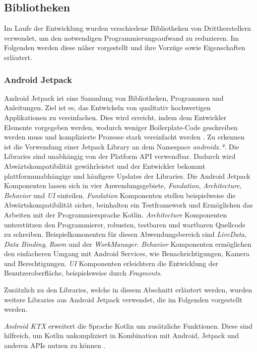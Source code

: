 \documentclass[a4paper]{article}
\begin{document}
\subsection{Bibliotheken}
\label{subsec:technologies:bibs}
Im Laufe der Entwicklung wurden verschiedene Bibliotheken von Drittherstellern verwendet, um den notwendigen Programmierungsaufwand zu reduzieren.
Im Folgenden werden diese näher vorgestellt und ihre Vorzüge sowie Eigenschaften erläutert.


\subsubsection{Android Jetpack}
\label{subsubsec:technologies:bibs:jetpack}
Android Jetpack ist eine Sammlung von Bibliotheken, Programmen und Anleitungen. Ziel ist es, das Entwickeln von qualitativ hochwertigen Applikationen zu vereinfachen. Dies wird erreicht, indem dem Entwickler Elemente vorgegeben werden, wodurch weniger Boilerplate-Code geschreiben werden muss und komplizierte Prozesse stark vereinfacht werden \cite{android_jetpack}. Zu erkennen ist die Verwendung einer Jetpack Library an dem Namespace \textit{androidx.*}. Die Libraries sind unabhängig von der Platform API verwendbar. Dadurch wird Abwärtskompatibilität gewährleistet und der Entwickler bekommt plattformunabhängige und häufigere Updates der Libraries. Die Android Jetpack Komponenten lassen sich in vier Anwendungsgebiete, \textit{Fundation}, \textit{Architecture}, \textit{Behavior} und \textit{UI} einteilen. \textit{Fundation} Komponenten stellen beispielweise die Abwärtskompatibilität sicher, beinhalten ein Testframework und Ermöglichen das Arbeiten mit der Programmiersprache Kotlin. \textit{Architecture} Komponenten unterstützen den Programmierer, robusten, testbaren und wartbaren Quellcode zu schreiben. Beispielkomonenten für diesen Abwendungsbereich sind \textit{LiveData}, \textit{Data Binding}, \textit{Room} und der \textit{WorkManager}. \textit{Behavior} Komponenten ermöglichen den einfacheren Umgang mit Android Services, wie Benachrichtigungen, Kamera und Berechtigungen. \textit{UI} Komponenten erleichtern die Entwicklung der Benutzeroberfläche, beispielsweise durch \textit{Fragments}.

Zusätzlich zu den Libraries, welche in diesem Abschnitt erläutert werden, wurden weitere Libraries aus Android Jetpack verwendet, die im Folgenden vorgestellt werden.

\textit{Android KTX} erweitert die Sprache Kotlin um zusätzliche Funktionen. Diese sind hilfreich, um Kotlin unkompliziert in Kombination mit Android, Jetpack und anderen APIs nutzen zu können \autocite{android_ktx}.
\end{document}

